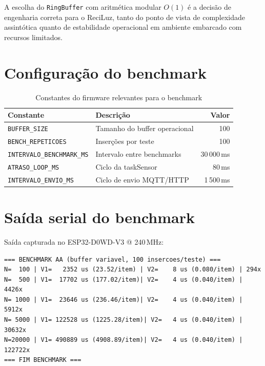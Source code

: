 \documentclass[12pt, a4paper]{article}
\theoremstyle{definition}
\theoremstyle{remark}
\begin{document}
A escolha do \texttt{RingBuffer} com aritmética modular $O(1)$ é a decisão
de engenharia correta para o ReciLuz, tanto do ponto de vista de
complexidade assintótica quanto de estabilidade operacional em ambiente
embarcado com recursos limitados.

\appendix
\section{Configuração do benchmark}

\begin{table}[H]
  \centering
  \caption{Constantes do firmware relevantes para o benchmark}
  \begin{tabular}{llr}
    \toprule
    Constante & Descrição & Valor \\
    \midrule
    \texttt{BUFFER\_SIZE}          & Tamanho do buffer operacional & 100 \\
    \texttt{BENCH\_REPETICOES}     & Inserções por teste           & 100 \\
    \texttt{INTERVALO\_BENCHMARK\_MS} & Intervalo entre benchmarks & 30\,000\,ms \\
    \texttt{ATRASO\_LOOP\_MS}      & Ciclo da taskSensor           & 80\,ms \\
    \texttt{INTERVALO\_ENVIO\_MS}  & Ciclo de envio MQTT/HTTP      & 1\,500\,ms \\
    \bottomrule
  \end{tabular}
\end{table}

\section{Saída serial do benchmark}

Saída capturada no ESP32-D0WD-V3 @ 240\,MHz:

\begin{lstlisting}[language={}, caption={Serial monitor — benchmark real}]
=== BENCHMARK AA (buffer variavel, 100 insercoes/teste) ===
N=  100 | V1=   2352 us (23.52/item) | V2=    8 us (0.080/item) | 294x
N=  500 | V1=  17702 us (177.02/item)| V2=    4 us (0.040/item) | 4426x
N= 1000 | V1=  23646 us (236.46/item)| V2=    4 us (0.040/item) | 5912x
N= 5000 | V1= 122528 us (1225.28/item)| V2=   4 us (0.040/item) | 30632x
N=20000 | V1= 490889 us (4908.89/item)| V2=   4 us (0.040/item) | 122722x
=== FIM BENCHMARK ===
\end{lstlisting}
\end{document}
